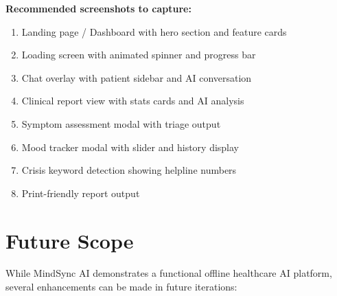 \documentclass[12pt,a4paper]{report}
\begin{document}
\textbf{Recommended screenshots to capture:}
\begin{enumerate}
    \item Landing page / Dashboard with hero section and feature cards
    \item Loading screen with animated spinner and progress bar
    \item Chat overlay with patient sidebar and AI conversation
    \item Clinical report view with stats cards and AI analysis
    \item Symptom assessment modal with triage output
    \item Mood tracker modal with slider and history display
    \item Crisis keyword detection showing helpline numbers
    \item Print-friendly report output
\end{enumerate}

\chapter{Future Scope}

While MindSync AI demonstrates a functional offline healthcare AI platform, several enhancements can be made in future iterations:
\end{document}
